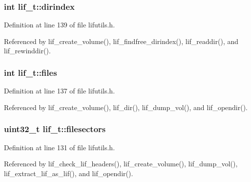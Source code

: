 \subsubsection[{\texorpdfstring{dirindex}{dirindex}}]{\setlength{\rightskip}{0pt plus 5cm}int lif\+\_\+t\+::dirindex}\hypertarget{structlif__t_a74f8af3dc203c3c6b9dea3829bb4b6fa}{}\label{structlif__t_a74f8af3dc203c3c6b9dea3829bb4b6fa}


Definition at line 139 of file lifutils.\+h.



Referenced by lif\+\_\+create\+\_\+volume(), lif\+\_\+findfree\+\_\+dirindex(), lif\+\_\+readdir(), and lif\+\_\+rewinddir().

\subsubsection[{\texorpdfstring{files}{files}}]{\setlength{\rightskip}{0pt plus 5cm}int lif\+\_\+t\+::files}\hypertarget{structlif__t_aceca398e2e3f6bcffe1593969544d546}{}\label{structlif__t_aceca398e2e3f6bcffe1593969544d546}


Definition at line 137 of file lifutils.\+h.



Referenced by lif\+\_\+create\+\_\+volume(), lif\+\_\+dir(), lif\+\_\+dump\+\_\+vol(), and lif\+\_\+opendir().

\subsubsection[{\texorpdfstring{filesectors}{filesectors}}]{\setlength{\rightskip}{0pt plus 5cm}uint32\+\_\+t lif\+\_\+t\+::filesectors}\hypertarget{structlif__t_a1223702cce63f879654d51773243643d}{}\label{structlif__t_a1223702cce63f879654d51773243643d}


Definition at line 131 of file lifutils.\+h.



Referenced by lif\+\_\+check\+\_\+lif\+\_\+headers(), lif\+\_\+create\+\_\+volume(), lif\+\_\+dump\+\_\+vol(), lif\+\_\+extract\+\_\+lif\+\_\+as\+\_\+lif(), and lif\+\_\+opendir().

